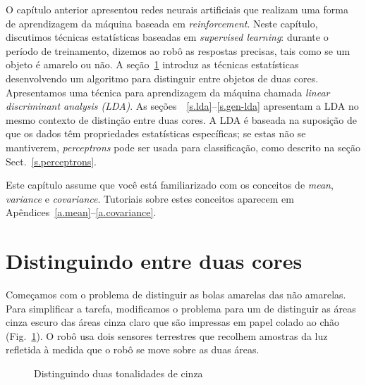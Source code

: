 O capítulo anterior apresentou redes neurais artificiais que realizam uma forma de aprendizagem da máquina baseada em \emph{reinforcement}. Neste capítulo, discutimos técnicas estatísticas baseadas em \emph{supervised learning}: durante o período de treinamento, dizemos ao robô as respostas precisas, tais como se um objeto é amarelo ou não. A seção~\ref{s.sorting-onesensor} introduz as técnicas estatísticas desenvolvendo um algoritmo para distinguir entre objetos de duas cores. Apresentamos uma técnica para aprendizagem da máquina chamada \emph{linear discriminant analysis (LDA)}. As seções~~\ref{s.lda}--\ref{s.gen-lda} apresentam a LDA no mesmo contexto de distinção entre duas cores. A LDA é baseada na suposição de que os dados têm propriedades estatísticas específicas; se estas não se mantiverem, \emph{perceptrons} pode ser usada para classificação, como descrito na seção Sect.~\ref{s.perceptrons}.

Este capítulo assume que você está familiarizado com os conceitos de \emph{mean}, \emph{variance} e \emph{covariance}. Tutoriais sobre estes conceitos aparecem em Apêndices~\ref{a.mean}--\ref{a.covariance}.

\section{Distinguindo entre duas cores}\label{s.sorting-onesensor}

Começamos com o problema de distinguir as bolas amarelas das não amarelas. Para simplificar a tarefa, modificamos o problema para um de distinguir as áreas cinza escuro das áreas cinza claro que são impressas em papel colado ao chão (Fig.~\ref{fig.closegrays1}). O robô usa dois sensores terrestres que recolhem amostras da luz refletida à medida que o robô se move sobre as duas áreas.

\begin{figure}
\begin{center}
\end{center}
\caption{Distinguindo duas tonalidades de cinza}\label{fig.closegrays1}
\end{figure}

